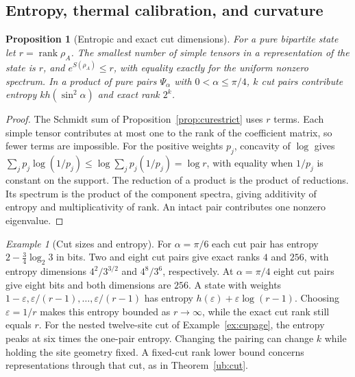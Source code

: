 \documentclass[aps,pra,onecolumn,superscriptaddress,nofootinbib,10pt]{revtex4-2}
\newtheorem{proposition}[theorem]{Proposition}
\theoremstyle{definition}
\theoremstyle{remark}
\newtheorem{example}[theorem]{Example}
\begin{document}
\subsection{Entropy, thermal calibration, and curvature}\label{ob:horizonentropy}

\begin{proposition}[Entropic and exact cut dimensions]\label{ob:cutdimension}
For a pure bipartite state let \(r=\operatorname{rank}\rho_A\).
The smallest number of simple tensors in a representation of the
state is \(r\), and \(e^{S(\rho_A)}\le r\), with equality exactly
for the uniform nonzero spectrum. In a product of pure pairs
\(\Psi_\alpha\) with \(0<\alpha\le\pi/4\), \(k\) cut pairs contribute
entropy \(kh(\sin^2\alpha)\) and exact rank \(2^k\).
\end{proposition}
\begin{proof}
The Schmidt sum of Proposition~\ref{prop:curestrict} uses \(r\) terms.
Each simple tensor contributes at most one to the rank of the
coefficient matrix, so fewer terms are impossible. For the positive
weights \(p_j\), concavity of \(\log\) gives
\(\sum_jp_j\log(1/p_j)\le\log\sum_jp_j(1/p_j)=\log r\), with equality
when \(1/p_j\) is constant on the support. The reduction of a product
is the product of reductions. Its spectrum is the product of the
component spectra, giving additivity of entropy and multiplicativity
of rank. An intact pair contributes one nonzero eigenvalue.
\end{proof}

\begin{example}[Cut sizes and entropy]\label{ob:cutexamples}
For \(\alpha=\pi/6\) each cut pair has entropy
\(2-\tfrac34\log_2 3\) in bits. Two and eight cut pairs give exact
ranks \(4\) and \(256\), with entropy dimensions \(4^2/3^{3/2}\) and
\(4^8/3^6\), respectively. At \(\alpha=\pi/4\) eight cut pairs give
eight bits and both dimensions are \(256\). A state with weights
\(1-\varepsilon,\varepsilon/(r-1),\dots,\varepsilon/(r-1)\) has
entropy \(h(\varepsilon)+\varepsilon\log(r-1)\). Choosing
\(\varepsilon=1/r\) makes this entropy bounded as \(r\to\infty\),
while the exact cut rank still equals \(r\).
For the nested twelve-site cut of Example~\ref{ex:cupage},
the entropy peaks at six times the one-pair entropy. Changing the
pairing can change \(k\) while holding the site geometry fixed. A
fixed-cut rank lower bound concerns representations through that cut,
as in Theorem~\ref{ub:cut}.
\end{example}
\end{document}

